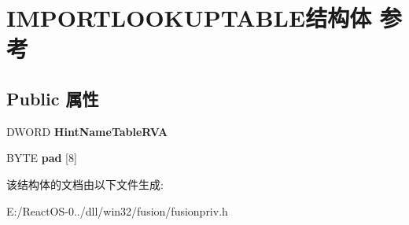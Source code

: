 \hypertarget{struct_i_m_p_o_r_t_l_o_o_k_u_p_t_a_b_l_e}{}\section{I\+M\+P\+O\+R\+T\+L\+O\+O\+K\+U\+P\+T\+A\+B\+L\+E结构体 参考}
\label{struct_i_m_p_o_r_t_l_o_o_k_u_p_t_a_b_l_e}
\subsection*{Public 属性}
\begin{DoxyCompactItemize}
\item 
\mbox{\label{struct_i_m_p_o_r_t_l_o_o_k_u_p_t_a_b_l_e_a621160d2df9baf43c95039d4518fff00}} 
D\+W\+O\+RD {\bfseries Hint\+Name\+Table\+R\+VA}
\item 
\mbox{\label{struct_i_m_p_o_r_t_l_o_o_k_u_p_t_a_b_l_e_a6ccdb084e8e50f2bab662c0926b0263e}} 
B\+Y\+TE {\bfseries pad} \mbox{[}8\mbox{]}
\end{DoxyCompactItemize}


该结构体的文档由以下文件生成\+:\begin{DoxyCompactItemize}
\item 
E\+:/\+React\+O\+S-\/0../dll/win32/fusion/fusionpriv.\+h\end{DoxyCompactItemize}
